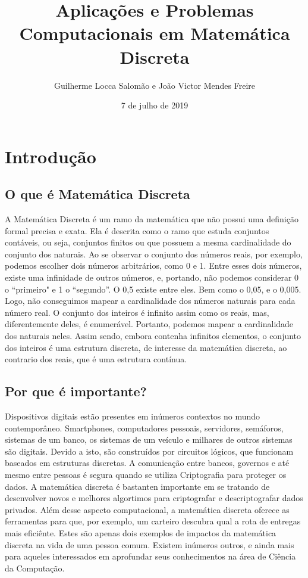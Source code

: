 \documentclass{article}
\title{Aplicações e Problemas Computacionais em Matemática Discreta}
\author{Guilherme Locca Salomão e João Victor Mendes Freire }
\date{7 de julho de 2019}
\begin{document}
\maketitle

\section{Introdução}
    \subsection{O que é Matemática Discreta}
    
    A Matemática Discreta é um ramo da matemática que não possui uma definição formal precisa e exata. Ela é descrita como o ramo que estuda conjuntos contáveis, ou seja, conjuntos finitos ou que possuem a mesma cardinalidade do conjunto dos naturais.
    Ao se observar o conjunto dos números reais, por exemplo, podemos escolher dois números arbitrários, como 0 e 1. Entre esses dois números, existe uma infinidade de outros números, e, portando, não podemos considerar 0 o “primeiro" e 1 o “segundo”. O 0,5 existe entre eles. Bem como o 0,05, e o 0,005. Logo, não conseguimos mapear a cardinalidade dos números naturais para cada número real.
    O conjunto dos inteiros é infinito assim como os reais, mas, diferentemente deles, é enumerável. Portanto, podemos mapear a cardinalidade dos naturais neles. 
    Assim sendo, embora contenha infinitos elementos, o conjunto dos inteiros é uma estrutura discreta, de interesse da matemática discreta, ao contrario dos reais, que é uma estrutura contínua.
    
    
    \subsection{Por que é importante?}
    Dispositivos digitais estão presentes em inúmeros contextos no mundo contemporâneo. Smartphones, computadores pessoais, servidores, semáforos, sistemas de um banco, os sistemas de um veículo e milhares de outros sistemas são digitais. Devido a isto, são construídos por circuitos lógicos, que funcionam baseados em estruturas discretas.
    A comunicação entre bancos, governos e até mesmo entre pessoas é segura quando se utiliza Criptografia para proteger os dados. A matemática discreta é bastanten importante em se tratando de desenvolver novos e melhores algortimos para criptografar e descriptografar dados privados.
    Além desse aspecto computacional, a matemática discreta oferece as ferramentas para que, por exemplo, um carteiro descubra qual a rota de entregas mais eficiênte.
    Estes são apenas dois exemplos de impactos da matemática discreta na vida de uma pessoa comum. Existem inúmeros outros, e ainda mais para aqueles interessados em aprofundar seus conhecimentos na área de Ciência da Computação.
    
\end{document}
